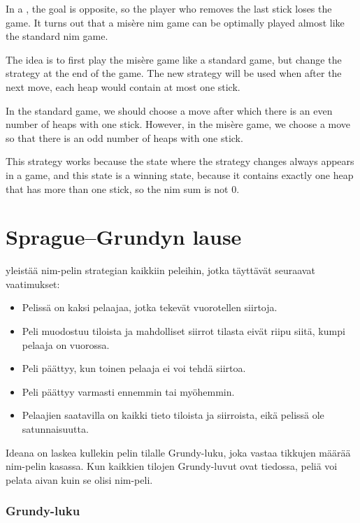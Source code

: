 
In a , the goal is opposite,
so the player who removes the last stick
loses the game.
It turns out that a misère nim game can be
optimally played almost like the standard nim game.

The idea is to first play the misère game
like a standard game, but change the strategy
at the end of the game.
The new strategy will be used when after the next move,
each heap would contain at most one stick.

In the standard game, we should choose a move
after which there is an even number of heaps with one stick.
However, in the misère game, we choose a move so that
there is an odd number of heaps with one stick.

This strategy works because the state where the
strategy changes always appears in a game,
and this state is a winning state, because
it contains exactly one heap that has more than one stick,
so the nim sum is not 0.

\section{Sprague–Grundyn lause}


 yleistää nim-pelin strategian
kaikkiin peleihin, jotka täyttävät
seuraavat vaatimukset:

\begin{itemize}[noitemsep]
\item Pelissä on kaksi pelaajaa, jotka tekevät vuorotellen siirtoja.
\item Peli muodostuu tiloista ja mahdolliset siirrot tilasta
eivät riipu siitä, kumpi pelaaja on vuorossa.
\item Peli päättyy, kun toinen pelaaja ei voi tehdä siirtoa.
\item Peli päättyy varmasti ennemmin tai myöhemmin.
\item Pelaajien saatavilla on kaikki tieto tiloista
ja siirroista, eikä pelissä ole satunnaisuutta.
\end{itemize}
Ideana on laskea kullekin pelin tilalle Grundy-luku,
joka vastaa tikkujen määrää nim-pelin kasassa.
Kun kaikkien tilojen Grundy-luvut ovat tiedossa,
peliä voi pelata aivan kuin se olisi nim-peli.

\subsubsection{Grundy-luku}

